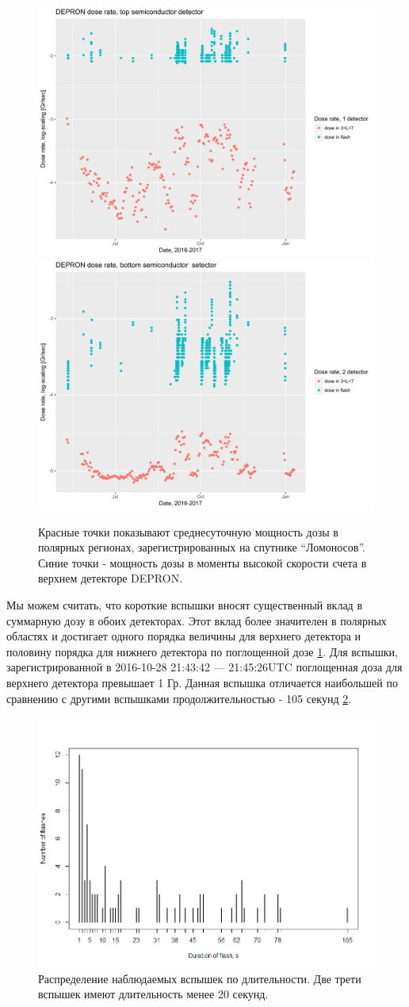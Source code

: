 \begin{figure}
	\centering
	\includegraphics[width=0.49\linewidth, trim={0 0.7cm 0 0}, clip]{images/doseanalisys/flashdose1}
	\includegraphics[width=0.49\linewidth, trim={0 0.7cm 0 0}, clip]{images/doseanalisys/flashdose2}
	\caption{Красные точки показывают среднесуточную мощность дозы в полярных регионах, зарегистрированных на спутнике ``Ломоносов''. Синие точки - мощность дозы в моменты высокой скорости счета в верхнем детекторе DEPRON.}
	\label{fig:flashdose1}
\end{figure}
Мы можем считать, что короткие вспышки вносят существенный вклад в суммарную дозу в обоих детекторах. Этот вклад более значителен в полярных областях и достигает одного порядка величины для верхнего детектора и половину порядка для нижнего детектора по поглощенной дозе \ref{fig:flashdose1}.  Для вспышки, зарегистрированной в 2016-10-28 21:43:42 --- 21:45:26UTC поглощенная доза для верхнего детектора превышает 1 Гр. Данная вспышка отличается наибольшей по сравнению с другими вспышками продолжительностью - 105 секунд \ref{fig:rplot12}.

\begin{figure}
	\centering
	\includegraphics[width=0.7\linewidth]{images/Flash/Rplot12}
	\caption{Распределение наблюдаемых вспышек по длительности. Две трети вспышек имеют длительность менее 20 секунд.}
	\label{fig:rplot12}
\end{figure}




